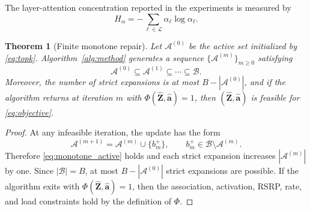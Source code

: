 \documentclass[journal]{IEEEtran}
\newtheorem{theorem}{Theorem}
\begin{document}
\noindent The layer-attention concentration reported in the experiments is
measured by
\begin{equation}
    H_{\alpha}=-\sum_{\ell\in\mathcal{L}}\alpha_{\ell}\log\alpha_{\ell}.
    \label{eq:attention_entropy}
\end{equation}

\begin{theorem}[Finite monotone repair]
\label{thm:finite_repair}
Let $\mathcal{A}^{(0)}$ be the active set initialized by
\eqref{eq:topk}. Algorithm~\ref{alg:method} generates a sequence
$\{\mathcal{A}^{(m)}\}_{m\geq0}$ satisfying
\begin{equation}
    \mathcal{A}^{(0)}\subseteq\mathcal{A}^{(1)}
    \subseteq\cdots\subseteq\mathcal{B}.
    \label{eq:monotone_active}
\end{equation}
Moreover, the number of strict expansions is at most $B-|\mathcal{A}^{(0)}|$,
and if the algorithm returns at iteration $m$ with
$\Phi(\widehat{\mathbf{Z}},\widehat{\mathbf{a}})=1$, then
$(\widehat{\mathbf{Z}},\widehat{\mathbf{a}})$ is feasible for
\eqref{eq:objective}.
\end{theorem}
\begin{proof}
At any infeasible iteration, the update has the form
\begin{equation}
    \mathcal{A}^{(m+1)}
    =
    \mathcal{A}^{(m)}\cup\{b^{+}_m\},\qquad
    b^{+}_m\in\mathcal{B}\setminus\mathcal{A}^{(m)}.
\end{equation}
Therefore \eqref{eq:monotone_active} holds and each strict expansion increases
$|\mathcal{A}^{(m)}|$ by one. Since $|\mathcal{B}|=B$, at most
$B-|\mathcal{A}^{(0)}|$ strict expansions are possible. If the algorithm exits
with $\Phi(\widehat{\mathbf{Z}},\widehat{\mathbf{a}})=1$, then the association,
activation, RSRP, rate, and load constraints hold by the definition of
$\Phi$.
\end{proof}
\end{document}
